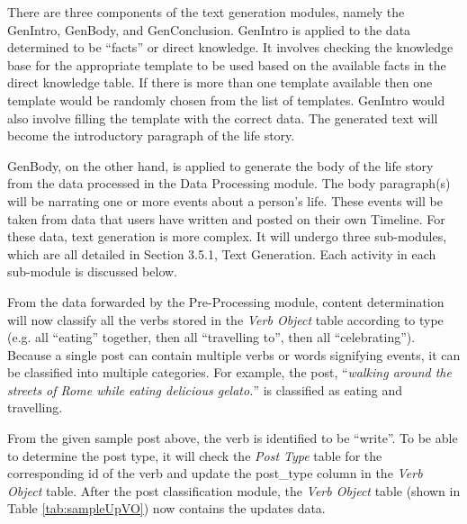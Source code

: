 There are three components of the text generation modules, namely the GenIntro, GenBody, and GenConclusion. GenIntro is applied to the data determined to be ``facts'' or direct knowledge. It involves checking the knowledge base for the appropriate template to be used based on the available facts in the direct knowledge table. If there is more than one template available then one template would be randomly chosen from the list of templates. GenIntro would also involve filling the template with the correct data. The generated text will become the introductory paragraph of the life story.

GenBody, on the other hand, is applied to generate the body of the life story from the data processed in the Data Processing module. The body paragraph(s) will be narrating one or more events about a person’s life. These events will be taken from data that users have written and posted on their own Timeline. For these data, text generation is more complex. It will undergo three sub-modules, which are all detailed in Section 3.5.1, Text Generation. Each activity in each sub-module is discussed below.

From the data forwarded by the Pre-Processing module, content determination will now classify all the verbs stored in the \textit{Verb Object} table according to type (e.g. all ``eating” together, then all ``travelling to”, then all ``celebrating”). Because a single post can contain multiple verbs or words signifying events, it can be classified into multiple categories. For example, the post, ``\textit{walking around the streets of Rome while eating delicious gelato.}” is classified as eating and travelling.

From the given sample post above, the verb is identified to be ``write”. To be able to determine the post type, it will check the \textit{Post Type} table for the corresponding id of the verb and update the post\_type column in the \textit{Verb Object} table. After the post classification module, the \textit{Verb Object} table (shown in Table  \ref{tab:sampleUpVO}) now contains the updates data.

